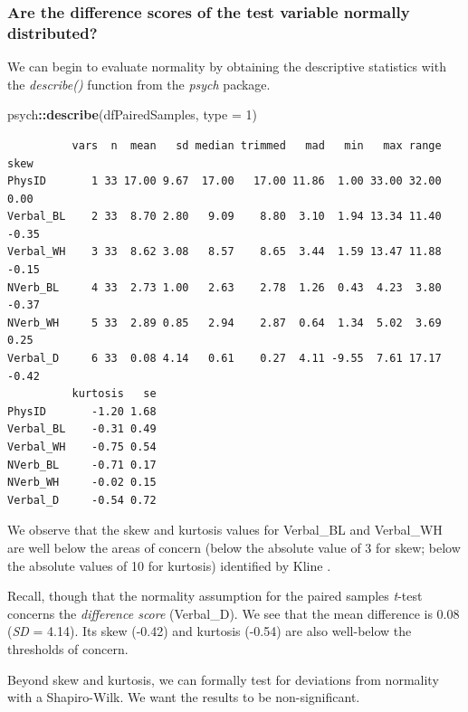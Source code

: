 \documentclass[
  11pt,
]{book}
\newenvironment{Shaded}{\begin{snugshade}}{\end{snugshade}}
\newcommand{\AttributeTok}[1]{\textcolor[rgb]{0.27,0.27,0.27}{#1}}
\newcommand{\DecValTok}[1]{\textcolor[rgb]{0.06,0.06,0.06}{#1}}
\newcommand{\FunctionTok}[1]{\textcolor[rgb]{0.27,0.27,0.27}{\textbf{#1}}}
\newcommand{\NormalTok}[1]{#1}
\newcommand{\SpecialCharTok}[1]{\textcolor[rgb]{0.43,0.43,0.43}{\textbf{#1}}}
\begin{document}
\hypertarget{are-the-difference-scores-of-the-test-variable-normally-distributed}{%
\subsubsection{Are the difference scores of the test variable normally distributed?}\label{are-the-difference-scores-of-the-test-variable-normally-distributed}}

We can begin to evaluate normality by obtaining the descriptive statistics with the \emph{describe()} function from the \emph{psych} package.

\begin{Shaded}
\begin{Highlighting}[]
\NormalTok{psych}\SpecialCharTok{::}\FunctionTok{describe}\NormalTok{(dfPairedSamples, }\AttributeTok{type =} \DecValTok{1}\NormalTok{)}
\end{Highlighting}
\end{Shaded}

\begin{verbatim}
          vars  n  mean   sd median trimmed   mad   min   max range  skew
PhysID       1 33 17.00 9.67  17.00   17.00 11.86  1.00 33.00 32.00  0.00
Verbal_BL    2 33  8.70 2.80   9.09    8.80  3.10  1.94 13.34 11.40 -0.35
Verbal_WH    3 33  8.62 3.08   8.57    8.65  3.44  1.59 13.47 11.88 -0.15
NVerb_BL     4 33  2.73 1.00   2.63    2.78  1.26  0.43  4.23  3.80 -0.37
NVerb_WH     5 33  2.89 0.85   2.94    2.87  0.64  1.34  5.02  3.69  0.25
Verbal_D     6 33  0.08 4.14   0.61    0.27  4.11 -9.55  7.61 17.17 -0.42
          kurtosis   se
PhysID       -1.20 1.68
Verbal_BL    -0.31 0.49
Verbal_WH    -0.75 0.54
NVerb_BL     -0.71 0.17
NVerb_WH     -0.02 0.15
Verbal_D     -0.54 0.72
\end{verbatim}

We observe that the skew and kurtosis values for Verbal\_BL and Verbal\_WH are well below the areas of concern (below the absolute value of 3 for skew; below the absolute values of 10 for kurtosis) identified by Kline \citeyearpar{kline_data_2016}.

Recall, though that the normality assumption for the paired samples \emph{t}-test concerns the \emph{difference score} (Verbal\_D). We see that the mean difference is 0.08 (\emph{SD} = 4.14). Its skew (-0.42) and kurtosis (-0.54) are also well-below the thresholds of concern.

Beyond skew and kurtosis, we can formally test for deviations from normality with a Shapiro-Wilk. We want the results to be non-significant.
\end{document}
